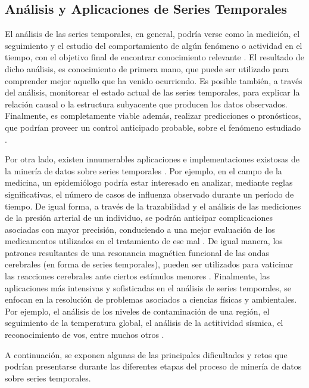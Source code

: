 \subsection{An\'alisis y Aplicaciones de Series Temporales}
El an\'alisis de las series temporales, en general, podr\'ia verse como la medici\'on, el seguimiento y el estudio del comportamiento de alg\'un fen\'omeno o  actividad en el tiempo, con el objetivo final de encontrar conocimiento relevante \cite{algoanalysis}. El resultado de dicho an\'alisis, es conocimiento de primera mano, que puede ser utilizado para comprender mejor aquello que ha venido ocurriendo. Es posible tambi\'en, a trav\'es del an\'alisis, monitorear el estado actual de las series temporales, para explicar la relaci\'on causal o la estructura subyacente que producen los datos observados. Finalmente, es completamente viable adem\'as, realizar predicciones o pron\'osticos, que podr\'ian proveer un control anticipado probable, sobre el fen\'omeno estudiado \cite{main}.\par
Por otra lado, existen innumerables aplicaciones e implementaciones existosas de la miner\'ia de datos sobre series temporales \cite{concepts}. Por ejemplo, en el campo de la medicina, un epidemi\'ologo podr\'ia estar interesado en analizar, mediante reglas significativas, el n\'umero de casos de influenza observado durante un per\'iodo de tiempo. De igual forma, a trav\'es de la trazabilidad y el an\'alisis de las mediciones de la presi\'on arterial de un individuo, se podr\'an anticipar complicaciones asociadas con mayor precisi\'on, conduciendo a una mejor evalua\-ci\'on de los medicamentos utilizados en el tratamiento de ese mal \cite{timeseriesapplications}. De igual manera, los patrones resultantes de una resonancia magn\'etica funcional de las ondas cerebrales (en forma de series temporales), pueden ser utilizados para vaticinar las reacciones cerebrales ante ciertos est\'imulos menores \cite{timeseriesapplications}. Finalmente, las aplicaciones m\'as intensivas y sofisticadas en el an\'alisis de series temporales, se enfocan en la resoluci\'on de problemas asociados a ciencias f\'isicas y ambientales. Por ejemplo, el an\'alisis de los niveles de contaminaci\'on de una regi\'on, el seguimiento de la temperatura global, el an\'alisis de la actitividad s\'ismica, el reconocimiento de vos, entre muchos otros \cite{timeseriesapplications}.\par
A continuaci\'on, se exponen algunas de las principales dificultades y retos que podr\'ian presentarse durante las diferentes etapas del proceso de miner\'ia de datos sobre series temporales.
